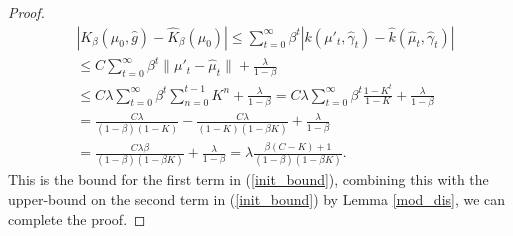 \documentclass[10pt,a4paper]{amsart}
\begin{document}
\begin{proof}
\begin{align*}
& \left| K_\beta(\mu_0,\hat{g})  - \hat{K}_\beta(\mu_0)\right| \leq \sum_{t=0}^\infty \beta^t \left| k(\mu'_t,\hat{\gamma}_t) - \hat{k}(\hat{\mu}_t,\hat{\gamma}_t) \right| \\
&\leq  C \sum_{t=0}^\infty \beta^t    \|\mu'_t - \hat{\mu}_t\| +  \frac{\lambda}{1-\beta}\\
&\leq C \lambda \sum_{t=0}^\infty \beta^t     \sum_{n=0}^{t-1} K^n +  \frac{\lambda}{1-\beta}= C\lambda \sum_{t=0}^\infty \beta^t \frac{1-K^t}{1-K} + \frac{\lambda}{1-\beta}\\
& = \frac{C\lambda}{(1-\beta)(1-K)}  - \frac{C\lambda}{(1-K)(1-\beta K)} + \frac{\lambda}{1-\beta}\\
&= \frac{C\lambda \beta}{(1-\beta)(1-\beta K)} + \frac{\lambda}{1-\beta} = \lambda\frac{\beta (C-K) +1}{(1-\beta)(1-\beta K)}.
\end{align*}
This is the bound for the first term in (\ref{init_bound}), combining this with the upper-bound on the second term in (\ref{init_bound}) by Lemma \ref{mod_dis}, we can complete the proof.
\end{proof}
\end{document}
